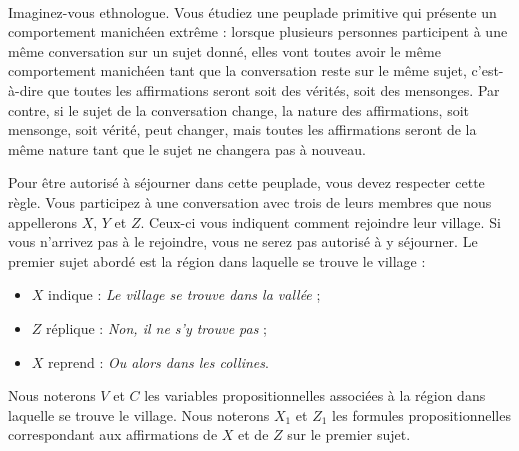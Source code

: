 \documentclass[11pt,a4paper]{article}
\begin{document}
\begin{Exercise}[title={Ethnologie}, origin={\bac {\sc ccinp} 2017}]\\
	Imaginez-vous ethnologue. Vous étudiez une peuplade primitive qui présente un comportement manichéen extrême : lorsque plusieurs personnes participent à une même conversation sur un sujet donné, elles vont toutes avoir le même comportement manichéen tant que la conversation reste sur le même sujet, c’est-à-dire que toutes les affirmations seront soit des vérités, soit des mensonges. Par contre, si le sujet de la conversation change, la nature des affirmations, soit mensonge, soit vérité, peut changer,	mais toutes les affirmations seront de la même nature tant que le sujet ne changera pas à nouveau.	
    
    Pour être autorisé à séjourner dans cette peuplade, vous devez respecter cette règle. Vous participez à	une conversation avec trois de leurs membres que nous appellerons $X$, $Y$ et $Z$. Ceux-ci vous indiquent	comment rejoindre leur village. Si vous n’arrivez pas à le rejoindre, vous ne serez pas autorisé à y	séjourner.	Le premier sujet abordé est la région dans laquelle se trouve le village :
    \begin{itemize}
    \item[] $X$ indique : \og{}\textit{Le village se trouve dans la vallée}\fg{} ;	
    \item[] $Z$ réplique : \og{}\textit{Non, il ne s’y trouve pas}\fg{} ;	
    \item[] $X$ reprend : \og{}\textit{Ou alors dans les collines}\fg{}.	
    \end{itemize}
    Nous noterons $V$ et $C$ les variables propositionnelles associées à la région dans laquelle se trouve le	village.	Nous noterons $X_1$ et $Z_1$ les formules propositionnelles correspondant aux affirmations de $X$ et de $Z$	sur le premier sujet.	
    

\end{Exercise}
\end{document}
